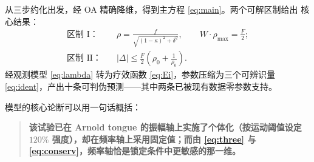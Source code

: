 从三步约化出发，经 OA 精确降维，得到主方程 \cref{eq:main}。两个可解区制给出
核心结果：
%
\begin{align*}
\text{区制 I：}\quad &\rho=\frac{f}{\sqrt{(1-\kappa)^2+\delta^2}},
  \qquad W\cdot\rho_{\max}=\frac{F}{2};\\
\text{区制 II：}\quad &|\Delta|\le\frac{F}{2}\left(\rho_0+\frac{1}{\rho_0}\right).
\end{align*}
%
经观测模型 \cref{eq:lambda} 转为疗效函数 \cref{eq:Ei}，参数压缩为三个可辨识量
\cref{eq:ident}，产出十条可判伪预测——其中两条已被现有数据零参数支持。

模型的核心论断可以用一句话概括：

\begin{quote}
\textbf{该试验已在 Arnold tongue 的振幅轴上实施了个体化（按运动阈值设定
$120\%$ 强度），却在频率轴上采用固定值；而由 \cref{eq:three} 与
\cref{eq:conserv}，频率轴恰是锁定条件中更敏感的那一维。}
\end{quote}
